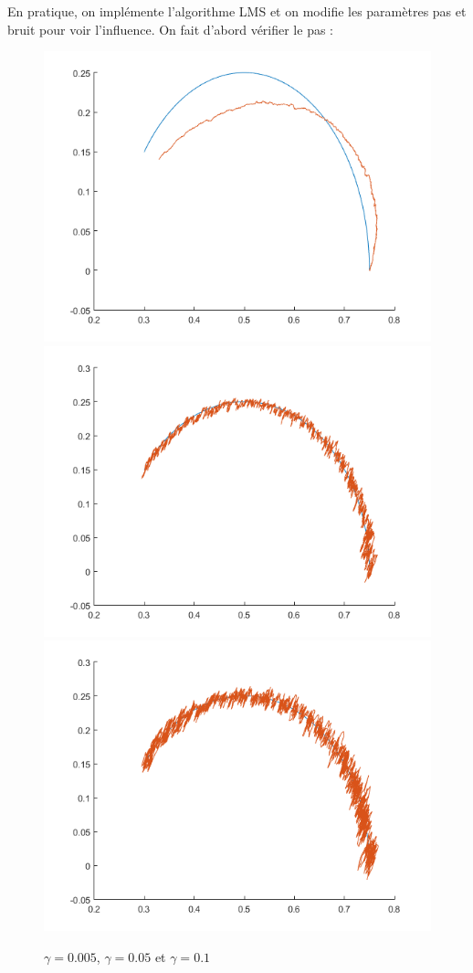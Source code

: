 \documentclass{article}
\begin{document}
En pratique, on impl\'emente l'algorithme LMS et on modifie les param\`etres pas et bruit pour voir l'influence. On fait d'abord v\'erifier le pas :
\begin{figure}[h]
\includegraphics[scale=0.25]{LMS_gamma0005.png} \includegraphics[scale=0.25]{LMS_gamma005.png} \includegraphics[scale=0.25]{LMS_gamma01.png} 
\caption{$\gamma=0.005$, $\gamma=0.05$ et $\gamma=0.1$}
\end{figure} 
\end{document}
